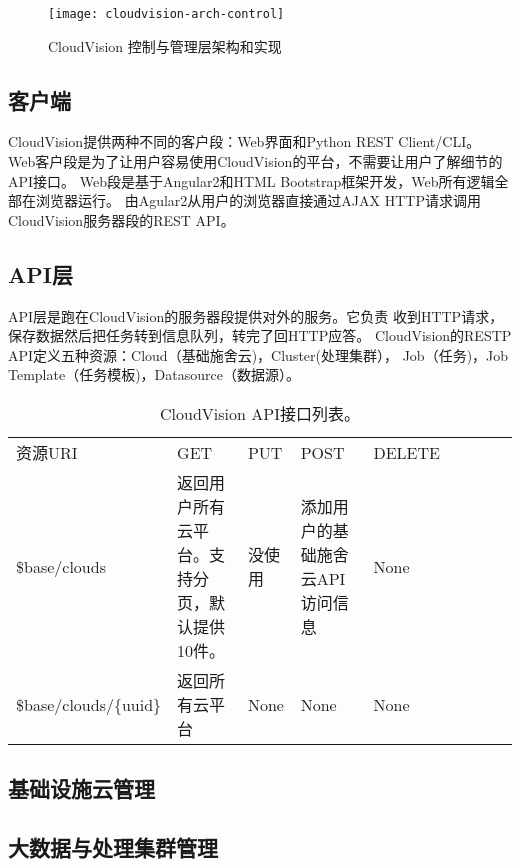 \begin{figure}[h]
  \centering
    \texttt{[image: cloudvision-arch-control]}
  \caption{CloudVision 控制与管理层架构和实现}
  \label{fig:cloudvision-arch-control}
\end{figure}

\subsection{客户端}
CloudVision提供两种不同的客户段：Web界面和Python REST Client/CLI。
Web客户段是为了让用户容易使用CloudVision的平台，不需要让用户了解细节的API接口。
Web段是基于Angular2和HTML Bootstrap框架开发，Web所有逻辑全部在浏览器运行。
由Agular2从用户的浏览器直接通过AJAX HTTP请求调用CloudVision服务器段的REST API。

\subsection{API层}
API层是跑在CloudVision的服务器段提供对外的服务。它负责
收到HTTP请求，保存数据然后把任务转到信息队列，转完了回HTTP应答。
CloudVision的RESTP API定义五种资源：Cloud（基础施舍云)，Cluster(处理集群），
Job（任务)，Job Template（任务模板)，Datasource（数据源）。

\begin{table}[htb]
  \centering
  \begin{minipage}[t]{0.95\linewidth} %
  \caption[CloudVision API接口列表]{CloudVision API接口列表。}
  \label{tab:template-files}
    \begin{tabularx}{\linewidth}{lXlXlXlXl}
      \toprule[1.5pt]
        资源URI & GET & PUT & POST & DELETE \\
        \$base/clouds & 返回用户所有云平台。支持分页，默认提供10件。 & 没使用 & 添加用户的基础施舍云API访问信息 & None \\
        \$base/clouds/\{uuid\} & 返回所有云平台 & None &  None & None \\

      \bottomrule[1.5pt]
    \end{tabularx}
  \end{minipage}
\end{table}



\subsection{基础设施云管理}
\subsection{大数据与处理集群管理}
